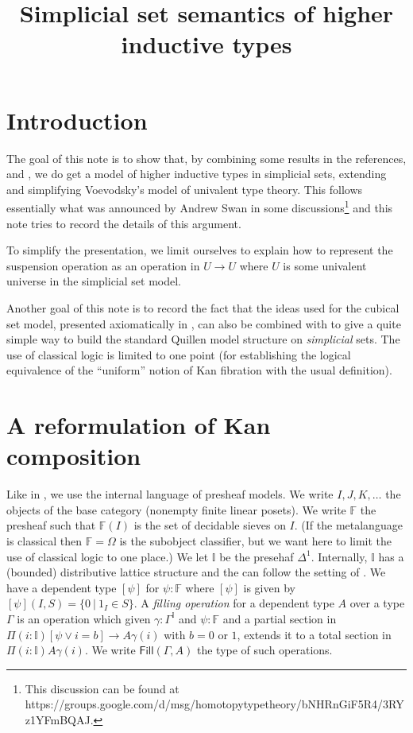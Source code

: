 \documentclass[10pt,a4paper]{article}
\newcommand{\II}{\mathbb{I}}
\newcommand{\FF}{\mathbb{F}}
\newcommand{\Fill}{\mathsf{Fill}}
\begin{document}
\title{Simplicial set semantics of higher inductive types}

\author{}
\date{}
\maketitle


\section*{Introduction}

 The goal of this note is to show that, by combining some results in
the references\cite{CHM}, \cite{GS} and \cite{OP}, we do get a model of higher inductive
types in simplicial sets, extending and simplifying Voevodsky's model of
univalent type theory. This follows essentially what was announced by Andrew Swan in 
some 
discussions\footnote{This discussion can be found at
https://groups.google.com/d/msg/homotopytypetheory/bNHRnGiF5R4/3RYz1YFmBQAJ.}
and this note tries to record the details of this argument.

 To simplify the presentation, we limit ourselves to explain how to represent
the suspension operation as an operation in $U\rightarrow U$ where $U$ is some
univalent universe in the simplicial set model.

 Another goal of this note is to record the fact that the ideas used for
the cubical set model, presented axiomatically in \cite{OP}, can also be
combined with \cite{Sattler} to give a quite simple way to build the
standard Quillen model structure on {\em simplicial} sets. The use of classical
logic is limited to one point (for establishing the logical equivalence of the
``uniform'' notion of Kan fibration with the usual definition).

\section{A reformulation of Kan composition}

 Like in \cite{OP}, we use the internal language of presheaf models.
We write $I,J,K,\dots$ the objects of the base category (nonempty
finite linear posets).
We write $\FF$ the presheaf such that $\FF(I)$ is the set of decidable
sieves on $I$. (If the metalanguage is classical then $\FF = \Omega$
is the subobject classifier, but we want here to limit the use of classical
logic to one place.) We let $\II$ be the presehaf $\Delta^1$.
Internally, $\II$ has a (bounded) distributive lattice structure
and the can follow the setting of \cite{CHM,OP}.
We have a dependent type $[\psi]$ for $\psi:\FF$ where $[\psi]$
is given by $[\psi](I,S) = \{0~|~1_I\in S\}$.
A {\em filling operation} for a dependent type $A$ over a type $\Gamma$
is an operation which given $\gamma:\Gamma^{\II}$ and $\psi:\FF$ and a partial section
in $\Pi (i:\II) [\psi\vee i = b]\rightarrow A\gamma(i)$ with $b = 0$ or $1$,
extends it to a total section in $\Pi (i:\II) A\gamma(i)$.
We write $\Fill(\Gamma,A)$ the type of such operations.
\end{document}
